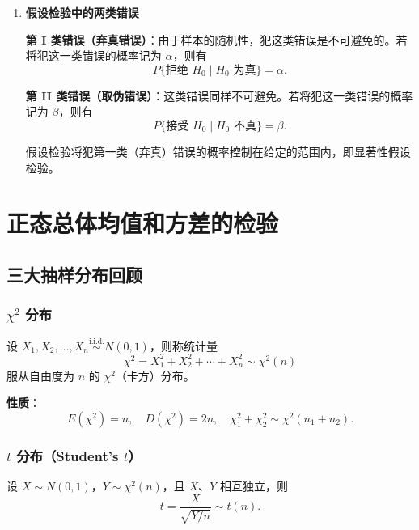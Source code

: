 \documentclass[11pt,a4paper]{report}
\theoremstyle{definition}
\begin{document}
\begin{enumerate}[label=\arabic*.,leftmargin=2em]
    \textbf{原理}：根据样本信息以抽样分布为理论依据在概率的基础上对总体参数进行推断，推断结果具有一定的可信程度和风险。

    \textbf{相关性}：假设检验等价于检验原假设的值是否落在置信区间。若落在置信区间内，则不拒绝 $H_{0}$，否则拒绝 $H_{0}$。

    \textbf{方法}：区间估计立足于大概率；假设检验立足于小概率。

    \item \textbf{假设检验中的两类错误}

    \textbf{第 I 类错误（弃真错误）}：由于样本的随机性，犯这类错误是不可避免的。若将犯这一类错误的概率记为 $\alpha$，则有
    \[
    P\{\text{拒绝 }H_{0}\mid H_{0}\text{ 为真}\}=\alpha.
    \]

    \textbf{第 II 类错误（取伪错误）}：这类错误同样不可避免。若将犯这一类错误的概率记为 $\beta$，则有
    \[
    P\{\text{接受 }H_{0}\mid H_{0}\text{ 不真}\}=\beta.
    \]

    假设检验将犯第一类（弃真）错误的概率控制在给定的范围内，即显著性假设检验。
\end{enumerate}

\section{正态总体均值和方差的检验}

\subsection{三大抽样分布回顾}

\subsubsection*{$\chi^{2}$ 分布}

设 $X_{1},X_{2},\ldots,X_{n}\stackrel{\text{i.i.d.}}{\sim}N(0,1)$，则称统计量
\[
\chi^{2}=X_{1}^{2}+X_{2}^{2}+\cdots+X_{n}^{2}\sim\chi^{2}(n)
\]
服从自由度为 $n$ 的 $\chi^{2}$（卡方）分布。

\textbf{性质}：
\[
E(\chi^{2})=n,\quad D(\chi^{2})=2n,\quad \chi_{1}^{2}+\chi_{2}^{2}\sim\chi^{2}(n_{1}+n_{2}).
\]

\subsubsection*{$t$ 分布（Student's $t$）}

设 $X\sim N(0,1)$，$Y\sim\chi^{2}(n)$，且 $X$、$Y$ 相互独立，则
\[
t=\frac{X}{\sqrt{Y/n}}\sim t(n).
\]
\end{document}
